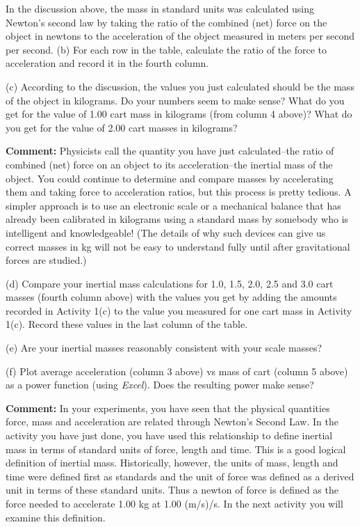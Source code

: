 In the discussion above, the mass in standard units was calculated using Newton's
second law by taking the ratio of the combined (net) force on the object in
newtons to the acceleration of the object measured in meters per second per
second. (b) For each row in the table, calculate the ratio of the force to acceleration
and record it in the fourth column.

(c) According to the discussion, the values you just calculated should be the
mass of the object in kilograms. Do your numbers seem to make sense? What do
you get for the value of 1.00 cart mass in kilograms (from column 4 above)? What do you get for the value of 2.00 cart masses in kilograms?
\answerspace{15mm}

\textbf{Comment:} Physicists call the quantity you have just calculated--the
ratio of combined (net) force on an object to its acceleration--the inertial
mass of the object. You could continue to determine and compare masses by accelerating them and taking force to acceleration ratios, but this process is pretty tedious.
A simpler approach is to use an electronic scale or a mechanical balance that
has already been calibrated in kilograms using a standard mass by somebody who
is intelligent and knowledgeable! (The details of why such devices can give
us correct masses in kg will not be easy to understand fully until after gravitational forces are studied.) 

(d) Compare your inertial mass calculations for 1.0, 1.5, 2.0, 2.5 and 3.0 cart
masses (fourth column above) with the values you get by adding the amounts recorded in Activity 1(c) to the value you measured for one cart mass in Activity 1(c). Record these values in the last column of the table.

(e) Are your inertial masses reasonably consistent with your scale masses?
\answerspace{10mm}

(f) Plot average acceleration (column 3 above) vs mass of cart (column 5 above) as a power function (using \textit{Excel}). Does the resulting power make sense?
\answerspace{5mm}

\textbf{Comment:} In your experiments, you have seen that the physical quantities
force, mass and acceleration are related through Newton's Second Law. In the
activity you have just done, you have used this relationship to define inertial
mass in terms of standard units of force, length and time. This is a good logical
definition of inertial mass. Historically, however, the units of mass, length
and time were defined first as standards and the unit of force was defined as
a derived unit in terms of these standard units. Thus a newton of force is defined
as the force needed to accelerate 1.00 kg at 1.00 (m/s)/s. In the next activity
you will examine this definition. 

